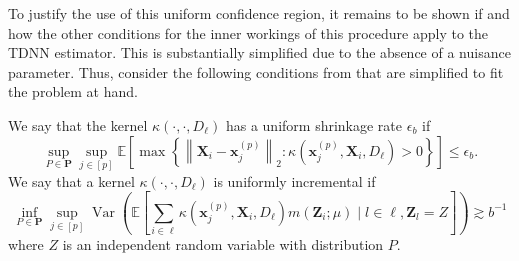 \documentclass[letterpaper,10pt]{article}
\numberwithin{equation}{section}
\numberwithin{theorem}{section}
\numberwithin{remark}{section}
\numberwithin{example}{section}
\theoremstyle{definition}
\newcommand{\1}{\mathbb{1}}
\begin{document}
To justify the use of this uniform confidence region, it remains to be shown if and how the other conditions for the inner workings of this procedure apply to the TDNN estimator.
This is substantially simplified due to the absence of a nuisance parameter.
Thus, consider the following conditions from \cite{ritzwoller_uniform_2024} that are simplified to fit the problem at hand.

\vspace{0.5cm}
\begin{definition}
	We say that the kernel $\kappa\left(\cdot, \cdot, D_{\ell}\right)$ has a uniform shrinkage rate $\epsilon_b$ if
	\begin{equation}
		\sup_{P \in \mathbf{P}} \sup_{j \in[p]}
		\mathbb{E}\left[\max \left\{\left\|\mathbf{X}_i-\mathbf{x}^{(p)}_{j}\right\|_{2}: \kappa\left(\mathbf{x}^{(p)}_{j}, \mathbf{X}_i, D_{\ell}\right)>0\right\}\right]
		\leq \epsilon_b .
	\end{equation}
	We say that a kernel $\kappa\left(\cdot, \cdot, D_{\ell}\right)$ is uniformly incremental if
	\begin{equation}
		\inf_{P \in \mathbf{P}} \sup_{j \in[p]}
		\operatorname{Var}\left(\mathbb{E}\left[\sum_{i \in \ell} \kappa\left(\mathbf{x}^{(p)}_{j}, \mathbf{X}_i, D_{\ell}\right) m\left(\mathbf{Z}_i ; \mu\right) \mid l \in \ell, \mathbf{Z}_l = Z\right]\right)
		\gtrsim b^{-1}
	\end{equation}
	where $Z$ is an independent random variable with distribution $P$.
\end{definition}
\end{document}
